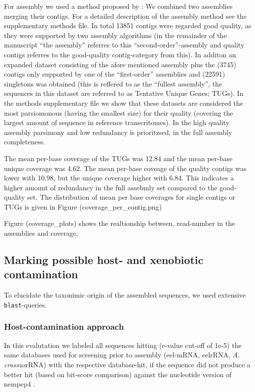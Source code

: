 \documentclass[10pt]{bmc_article}
\newenvironment{bmcformat}{\begin{raggedright}\baselineskip20pt\sloppy\setboolean{publ}{false}}{\end{raggedright}\baselineskip20pt\sloppy}
\begin{document}
\begin{bmcformat}
For assembly we used a method proposed by \cite{pmid20950480}: We
combined two assemblies merging their contigs. For a detailed
description of the assembly method see the supplementary methods
file. In total 13851 contigs were regarded good quality, as they
were supported by two assembly algorithms (in the remainder of the
manuscript ``the assembly'' referres to this ``second-order''-assembly
and quality contigs referres to the good-quality contig-category from
this). In additon an expanded dataset consisting of the afore
mentioned assembly plus the (3745) contigs only supported by
one of the ``first-order'' assemblies and (22591) singletons
was obtained (this is reffered to as the ``fullest assembly'', the
sequences in this dataset are referred to as Tentative Unique Genes;
TUGs). In the methods supplementary file we show that these datasets
are considered the most parsiomonous (having the smallest size) for
their quality (covering the largest amount of sequence in reference
transcritomes). In the high quality assembly parsimony and low
redundancy is prioritzsed, in the full assembly completeness.


The mean per-base coverage of the TUGs was 12.84 and the mean
per-base unique coverage was 4.62. The mean per-base coveage
of the quality contigs was lower with 10.98, but the unique
coverage higher with 6.84. This indicates a higher amount
of redundancy in the full assebmly set compared to the good-quality
set. The distribution of mean per base coverages for single contigs or
TUGs is given in Figure (coverage\_per\_contig.png)

Figure (coverage\_plots) shows the realtionship between, read-number
in the assemblies and coverage.

\subsection*{Marking possible host- and xenobiotic contamination}



To elucidate the taxonimic origin of the assembled sequences, we used
extensive \texttt{blast}-queries.

\subsubsection*{Host-contamination approach}

In this evalutation we labeled all sequences hitting (e-value
cut-off of 1e-5) the same databases used for screening prior to
assembly (eel-mRNA, eelrRNA, \textit{A. crassus}rRNA) with the
respective database-hit, if the sequence did not produce a better hit
(based on bit-score comparison) against the nucleotide version of
nempep4 \cite{pmid21550347}.  


\end{bmcformat}
\end{document}
